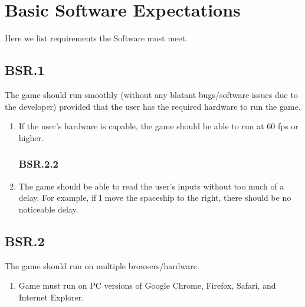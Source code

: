 \documentclass[12pt, letterpaper]{article}
\begin{document}
   \section{Basic Software Expectations}
   
   Here we list requirements the Software must meet. 
   
   \subsection*{BSR.1}
   
    The game should run smoothly (without any blatant bugs/software issues due to the developer) provided that the user has the required hardware to run the game.
    \begin{enumerate}[label=]
        \subsubsection*{BSR.1.1}
        \item If the user's hardware is capable, the game should be able to run at 60 fps or higher.
        \subsubsection*{BSR.2.2}
        \item The game should be able to read the user's inputs without too much of a delay. For example, if I move the spaceship to the right, there should be no noticeable delay. 
    \end{enumerate}
    
    \subsection*{BSR.2}
    
    The game should run on multiple browsers/hardware.
    \begin{enumerate}[label=]
        \subsubsection*{BSR.2.1}
        \item Game must run on PC versions of Google Chrome, Firefox, Safari, and Internet Explorer. 
    \end{enumerate}
    
\end{document}
